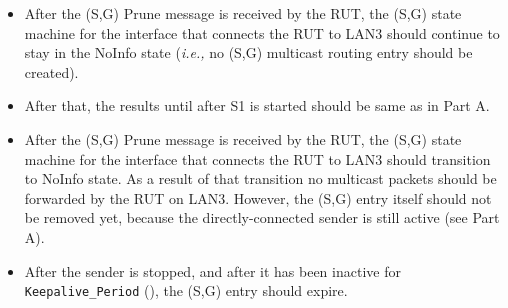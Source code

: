 \documentclass[11pt]{report}
\newcommand{\ie}{\emph{i.e.,}\xspace}
\begin{document}
\begin{itemize}

  \item After the (S,G) Prune message is received by the RUT,
  the (S,G) state machine for the interface that connects the RUT to
  LAN3 should continue to stay in the NoInfo state (\ie no (S,G) multicast
  routing entry should be created).

  \item After that, the results until after S1 is started should be same as in
  Part A.

  \item After the (S,G) Prune message is received by the RUT,
  the (S,G) state machine for the interface that connects the RUT to
  LAN3 should transition to NoInfo state.
  As a result of that transition no multicast packets should be
  forwarded by the RUT on LAN3.
  However, the (S,G) entry itself should not be removed yet, because the
  directly-connected sender is still active (see Part A).

 \item After the sender is stopped, and after it has been inactive
  for \verb=Keepalive_Period= ({\PimsmKeepalivePeriod}), the (S,G) entry
  should expire.

\end{itemize}

\end{document}
